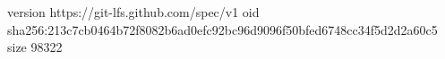 version https://git-lfs.github.com/spec/v1
oid sha256:213c7cb0464b72f8082b6ad0efc92bc96d9096f50bfed6748cc34f5d2d2a60c5
size 98322
